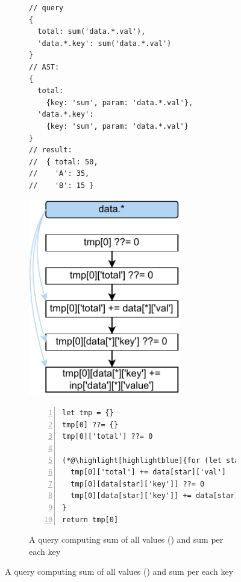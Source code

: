\documentclass[runningheads]{llncs}
\begin{document}
\begin{figure}[t!]
\begin{subfigure}{\textwidth}
\begin{minipage}{0.33\textwidth}
\begin{lstlisting}[style=JavaScriptTiny, columns=flexible]
// query
{
  total: sum('data.*.val'),
  'data.*.key': sum('data.*.val')
}
// AST:
{
  total:
    {key: 'sum', param: 'data.*.val'},
  'data.*.key':
    {key: 'sum', param: 'data.*.val'}
}
// result:
//  { total: 50, 
//    'A': 35,
//    'B': 15 }
\end{lstlisting}
\end{minipage}
\begin{minipage}{0.27\textwidth}
\centering
\includegraphics[width=0.73\textwidth]{images/intro_q2_ir.pdf}
\end{minipage}
\begin{minipage}{0.38\textwidth}
\begin{lstlisting}[style=JavaScriptTiny, columns=flexible, numbers=left, xleftmargin=2pt]
let tmp = {}
tmp[0] ??= {}
tmp[0]['total'] ??= 0

(*@\highlight[highlightblue]{for (let star in data) }@*) {
  tmp[0]['total'] += data[star]['val']
  tmp[0][data[star]['key']] ??= 0
  tmp[0][data[star]['key']] += data[star]['val']
}
return tmp[0]
\end{lstlisting}
\end{minipage}
\caption{A query computing sum of all values
() and sum per each key}\label{fig:intro_q2}
\end{subfigure}


\end{figure}
\end{document}
